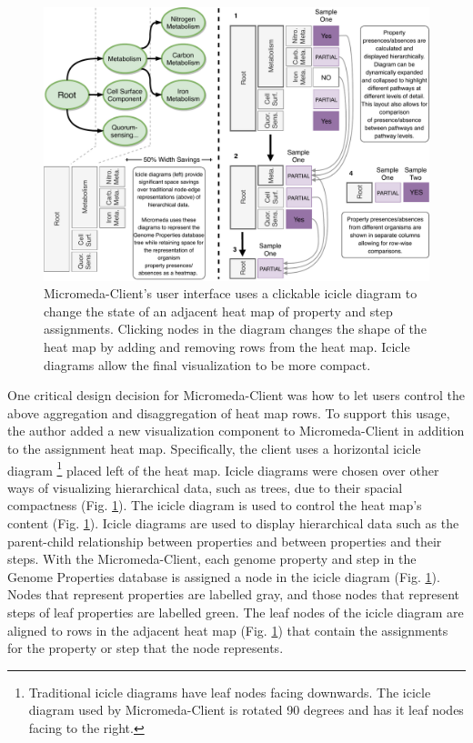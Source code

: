 \begin{figure}[!ht]
  \centering
	\includegraphics[width=\textwidth]{media/visualization_design_philosphy.pdf}
	 \caption{Micromeda-Client's user interface uses a clickable icicle diagram to change the state of an adjacent heat map of property and step assignments. Clicking nodes in the diagram changes the shape of the heat map by adding and removing rows from the heat map. Icicle diagrams allow the final visualization to be more compact.}
	 \label{fig:visualization-philosophy}
\end{figure}

One critical design decision for Micromeda-Client was how to let users control the above aggregation and disaggregation of heat map rows. To support this usage, the author added a new visualization component to Micromeda-Client in addition to the assignment heat map. Specifically, the client uses a horizontal icicle diagram \footnote{Traditional icicle diagrams have leaf nodes facing downwards. The icicle diagram used by Micromeda-Client is rotated 90 degrees and has it leaf nodes facing to the right.} placed left of the heat map. Icicle diagrams were chosen over other ways of visualizing hierarchical data, such as trees, due to their spacial compactness (Fig. \ref{fig:visualization-philosophy}). The icicle diagram is used to control the heat map's content (Fig. \ref{fig:visualization-philosophy}). Icicle diagrams are used to display hierarchical data such as the parent-child relationship between properties and between properties and their steps. With the Micromeda-Client, each genome property and step in the Genome Properties database is assigned a node in the icicle diagram (Fig. \ref{fig:visualization-philosophy}). Nodes that represent properties are labelled gray, and those nodes that represent steps of leaf properties are labelled green. The leaf nodes of the icicle diagram are aligned to rows in the adjacent heat map (Fig. \ref{fig:visualization-philosophy}) that contain the assignments for the property or step that the node represents.

